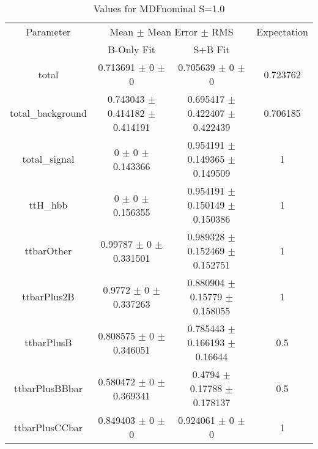 \begin{table}
\centering
\caption{Values for MDFnominal S=1.0}
\begin{tabular}{cccc}
\toprule
Parameter & \multicolumn{2}{c}{Mean $\pm$ Mean Error $\pm$ RMS} & Expectation\\
 & B-Only Fit & S+B Fit & \\
\midrule
total & \num{0.713691} $\pm$ \num{0} $\pm$ \num{0} & \num{0.705639} $\pm$ \num{0} $\pm$ \num{0} & \num{0.723762}\\
total\_background & \num{0.743043} $\pm$ \num{0.414182} $\pm$ \num{0.414191} & \num{0.695417} $\pm$ \num{0.422407} $\pm$ \num{0.422439} & \num{0.706185}\\
total\_signal & \num{0} $\pm$ \num{0} $\pm$ \num{0.143366} & \num{0.954191} $\pm$ \num{0.149365} $\pm$ \num{0.149509} & \num{1}\\
ttH\_hbb & \num{0} $\pm$ \num{0} $\pm$ \num{0.156355} & \num{0.954191} $\pm$ \num{0.150149} $\pm$ \num{0.150386} & \num{1}\\
ttbarOther & \num{0.99787} $\pm$ \num{0} $\pm$ \num{0.331501} & \num{0.989328} $\pm$ \num{0.152469} $\pm$ \num{0.152751} & \num{1}\\
ttbarPlus2B & \num{0.9772} $\pm$ \num{0} $\pm$ \num{0.337263} & \num{0.880904} $\pm$ \num{0.15779} $\pm$ \num{0.158055} & \num{1}\\
ttbarPlusB & \num{0.808575} $\pm$ \num{0} $\pm$ \num{0.346051} & \num{0.785443} $\pm$ \num{0.166193} $\pm$ \num{0.16644} & \num{0.5}\\
ttbarPlusBBbar & \num{0.580472} $\pm$ \num{0} $\pm$ \num{0.369341} & \num{0.4794} $\pm$ \num{0.17788} $\pm$ \num{0.178137} & \num{0.5}\\
ttbarPlusCCbar & \num{0.849403} $\pm$ \num{0} $\pm$ \num{0} & \num{0.924061} $\pm$ \num{0} $\pm$ \num{0} & \num{1}\\
\bottomrule
\end{tabular}
\end{table}